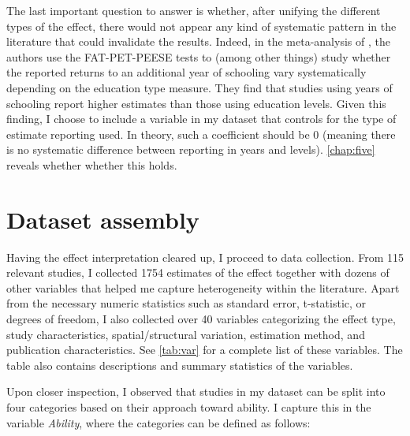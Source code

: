 The last important question to answer is whether, after unifying the different types of the effect, there would not appear any kind of systematic pattern in the literature that could invalidate the results. Indeed, in the meta-analysis of \cite{churchill2018meta}, the authors use the FAT-PET-PEESE tests to (among other things) study whether the reported returns to an additional year of schooling vary systematically depending on the education type measure. They find that studies using years of schooling report higher estimates than those using education levels. Given this finding, I choose to include a variable in my dataset that controls for the type of estimate reporting used. In theory, such a coefficient should be 0 (meaning there is no systematic difference between reporting in years and levels). \autoref{chap:five} reveals whether whether this holds.

\section{Dataset assembly}
\label{sec:data_set}

Having the effect interpretation cleared up, I proceed to data collection. From 115 relevant studies, I collected 1754 estimates of the effect together with dozens of other variables that helped me capture heterogeneity within the literature. Apart from the necessary numeric statistics such as standard error, t-statistic, or degrees of freedom, I also collected over 40 variables categorizing the effect type, study characteristics, spatial/structural variation, estimation method, and publication characteristics. See \autoref{tab:var} for a complete list of these variables. The table also contains descriptions and summary statistics of the variables.

Upon closer inspection, I observed that studies in my dataset can be split into four categories based on their approach toward ability. I capture this in the variable \textit{Ability}, where the categories can be defined as follows:

